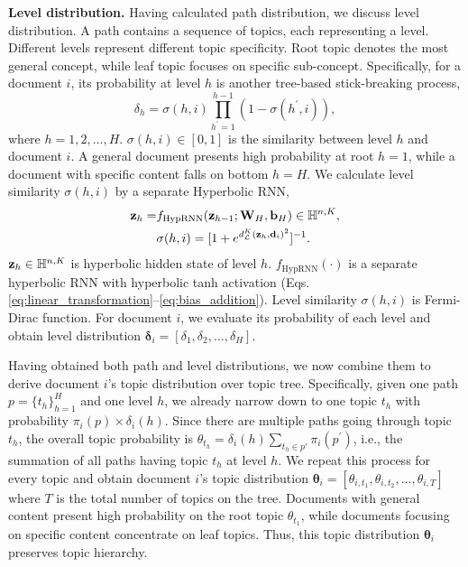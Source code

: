 \textbf{Level distribution.} Having calculated path distribution, we discuss level distribution. A path contains a sequence of topics, each representing a level. Different levels represent different topic specificity. Root topic denotes the most general concept, while leaf topic focuses on specific sub-concept. %
Specifically, for a document $ i $, its probability at level $ h $ is another tree-based stick-breaking process,
\begin{equation}
    \delta_h=\sigma(h,i)\prod_{h^\prime=1}^{h-1}(1-\sigma(h^\prime,i)),%
\end{equation}
where $ h=1,2,...,H $. $ \sigma(h,i)\in[0,1] $ is the similarity between level $ h $ and document $ i $. A general document presents high probability at root $ h=1 $, while a document with specific content falls on bottom $ h=H $. We calculate level similarity $ \sigma(h,i) $ by a separate Hyperbolic RNN, %
\begin{equation}
\begin{split}
    \textbf{z}_h=&f_{\text{HypRNN}}(\textbf{z}_{h-1};\textbf{W}_H,\textbf{b}_H)\in\Bbb H^{n,K},\\
    &\sigma(h,i)=[1+e^{d_{\mathcal{L}}^K(\textbf{z}_h,\textbf{d}_i)^2}]^{-1}.
\end{split}
\end{equation}
$ \textbf{z}_h\in\Bbb H^{n,K} $ is hyperbolic hidden state of level $ h $. $ f_{\text{HypRNN}}(\cdot) $ is a separate hyperbolic RNN with hyperbolic tanh activation (Eqs. \ref{eq:linear_transformation}--\ref{eq:bias_addition}). Level similarity $ \sigma(h,i) $ is Fermi-Dirac function. For document $ i $, we evaluate its probability of each level and obtain level distribution $ \bm{\delta}_i=[\delta_1,\delta_2,...,\delta_H] $.

Having obtained both path and level distributions, we now combine them to derive document $ i $'s topic distribution over topic tree. Specifically, given one path $ p=\{t_h\}_{h=1}^H $ and one level $ h $, we already narrow down to one topic $ t_h $ with probability $ \pi_i(p)\times\delta_i(h) $. Since there are multiple paths going through topic $ t_h $, the overall topic probability is $ \theta_{t_h}=\delta_i(h)\sum_{t_h\in p'}\pi_i(p^\prime) $, i.e., the summation of all paths having topic $ t_h $ at level $ h $. We repeat this process for every topic and obtain document $ i $'s topic distribution $ \bm{\theta}_i=[\theta_{i,t_1},\theta_{i,t_2},...,\theta_{i,T}] $ where $ T $ is the total number of topics on the tree. Documents with general content present high probability on the root topic $ \theta_{t_1} $, while documents focusing on specific content concentrate on leaf topics. Thus, this topic distribution $ \bm{\theta}_i $ preserves topic hierarchy.  %


